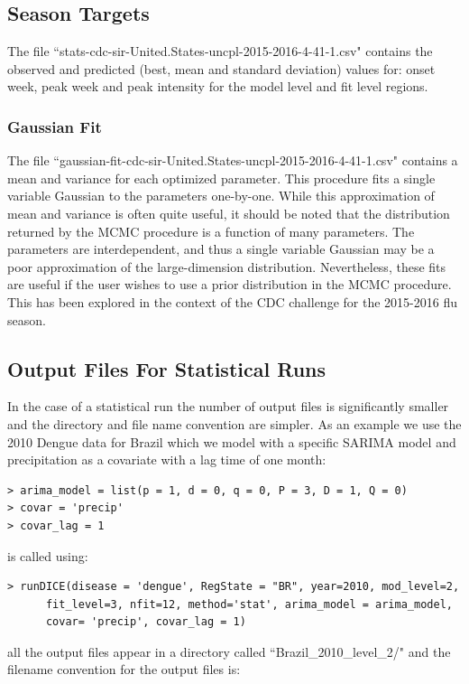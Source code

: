 \documentclass[a4paper]{article}
\begin{document}
\subsection{Season Targets}
The file ``stats-cdc-sir-United.States-uncpl-2015-2016-4-41-1.csv" contains the observed and predicted (best, mean and standard deviation) values for: onset week, peak week and peak intensity for the model level and fit level regions.

\subsubsection{Gaussian Fit}
The file ``gaussian-fit-cdc-sir-United.States-uncpl-2015-2016-4-41-1.csv" contains a mean and variance for each optimized parameter.  This procedure fits a single variable Gaussian to the parameters one-by-one.  While this approximation of mean and variance is often quite useful, it should be noted that the distribution returned by the MCMC procedure is a function of many parameters.  The parameters are interdependent, and thus a single variable Gaussian may be a poor approximation of the large-dimension distribution. Nevertheless, these fits are useful if the user wishes to use a prior distribution in the MCMC procedure.  This has been explored in the context of the CDC challenge for the 2015-2016 flu season.

\subsection{Output Files For Statistical Runs}
In the case of a statistical run the number of output files is significantly smaller and the directory and file name convention are simpler. As an example we use the 2010 Dengue data for Brazil which we model with a specific SARIMA model and precipitation as a covariate with a lag time of one month:

\begin{verbatim}
> arima_model = list(p = 1, d = 0, q = 0, P = 3, D = 1, Q = 0)
> covar = 'precip'
> covar_lag = 1
\end{verbatim}

 is called using:

\begin{verbatim}
> runDICE(disease = 'dengue', RegState = "BR", year=2010, mod_level=2,
      fit_level=3, nfit=12, method='stat', arima_model = arima_model,
      covar= 'precip', covar_lag = 1)
\end{verbatim}
all the output files appear in a directory called ``Brazil\_2010\_level\_2/" and the filename convention for the output files is:
\end{document}
